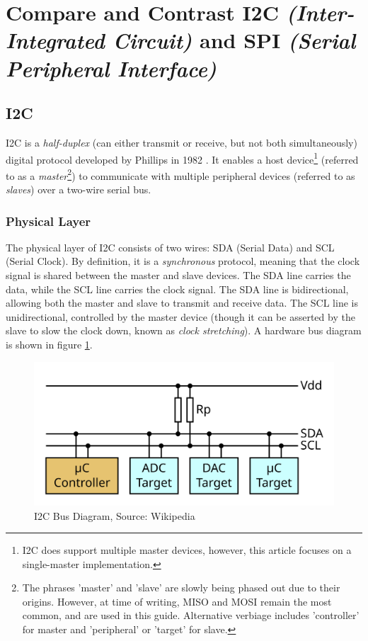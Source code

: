 \documentclass[main.tex]{subfiles}
\begin{document}
\section{Compare and Contrast I2C \textit{(Inter-Integrated Circuit)} and SPI \textit{(Serial Peripheral Interface)}} \label{section:compare_i2c_spi} %
\spoilerline

\subsection{I2C}
I2C is a \textit{half-duplex} (can either transmit or receive, but not both simultaneously) digital protocol developed by Phillips in 1982 \cite{sparkfun_i2c_history}. It enables a host device\footnote{I2C does support multiple master devices, however, this article focuses on a single-master implementation.} (referred to as a \textit{master}\footnote{The phrases 'master' and 'slave' are slowly being phased out due to their origins. However, at time of writing, MISO and MOSI remain the most common, and are used in this guide. Alternative verbiage includes 'controller' for master and 'peripheral' or 'target' for slave.}) to communicate with multiple peripheral devices (referred to as \textit{slaves}) over a two-wire serial bus. 
\subsubsection{Physical Layer}
The physical layer of I2C consists of two wires: SDA (Serial Data) and SCL (Serial Clock). By definition, it is a \textit{synchronous} protocol, meaning that the clock signal is shared between the master and slave devices. The SDA line carries the data, while the SCL line carries the clock signal. The SDA line is bidirectional, allowing both the master and slave to transmit and receive data. The SCL line is unidirectional, controlled by the master device (though it can be asserted by the slave to slow the clock down, known as \textit{clock stretching}). A hardware bus diagram is shown in figure \ref{fig:i2c_bus}.

\begin{figure}[H]
    \centering
    \includegraphics[scale=0.09]{images/I2C_controller-target.png}
    \caption{I2C Bus Diagram, Source: Wikipedia \cite{wikipedia_i2c_bus_image}}
    \label{fig:i2c_bus}
\end{figure}
\end{document}
